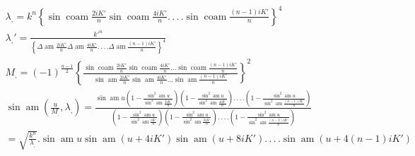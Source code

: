 \documentclass{article}
\begin{document}
\[
\begin{gathered}
\lambda_{,}=k^{n}\left\{\sin\operatorname{coam}\frac{2iK'}{n}\sin\operatorname{coam}\frac{4iK'}{n}.\,.\,.\,.\sin\operatorname{coam}\frac{(n-1)iK'}{n}\right\}^{4}\\[2ex]
\lambda_{,}'=\frac{k'^{n}}{\left\{\Delta\operatorname{am}\frac{2iK'}{n}\Delta\operatorname{am}\frac{4iK'}{n}.\,.\,.\,.\Delta\operatorname{am}\frac{(n-1)iK'}{n}\right\}^{4}}\\[2.5ex]
M_{,}=(-1)^{\frac{n-1}{2}}\left\{\frac{\sin\operatorname{coam}\frac{2iK'}{n}\sin\operatorname{coam}\frac{4iK'}{n}\ldots\sin\operatorname{coam}\frac{(n-1)iK'}{n}}{\sin\operatorname{am}\frac{2iK'}{n}\sin\operatorname{am}\frac{4iK'}{n}\ldots\sin\operatorname{am}\frac{(n-1)iK'}{n}}\right\}^{2}\\[2.5ex]
\sin\operatorname{am}\left(\frac{u}{M_{,}},\lambda_{,}\right)=\frac{\sin\operatorname{am}u\left(1-\frac{\sin^{2}\operatorname{am}u}{\sin^{2}\operatorname{am}\frac{2iK'}{n}}\right)\left(1-\frac{\sin^{2}\operatorname{am}u}{\sin^{2}\operatorname{am}\frac{4iK'}{n}}\right).\,.\,.\,.\left(1-\frac{\sin^{2}\operatorname{am}u}{\sin^{2}\operatorname{am}\frac{(n-1)iK'}{n}}\right)}{\left(1-\frac{\sin^{2}\operatorname{am}u}{\sin^{2}\operatorname{am}\frac{iK'}{n}}\right)\left(1-\frac{\sin^{2}\operatorname{am}u}{\sin^{2}\operatorname{am}\frac{3iK'}{n}}\right).\,.\,.\,.\left(1-\frac{\sin^{2}\operatorname{am}u}{\sin^{2}\operatorname{am}\frac{(n-2)iK'}{n}}\right)}\\[2.5ex]
=\sqrt{\frac{k^{n}}{\lambda_{,}}}.\sin\operatorname{am}u\sin\operatorname{am}(u+4iK')\sin\operatorname{am}(u+8iK').\,.\,.\,.\sin\operatorname{am}(u+4(n-1)iK')
\end{gathered}
\]
\end{document}
